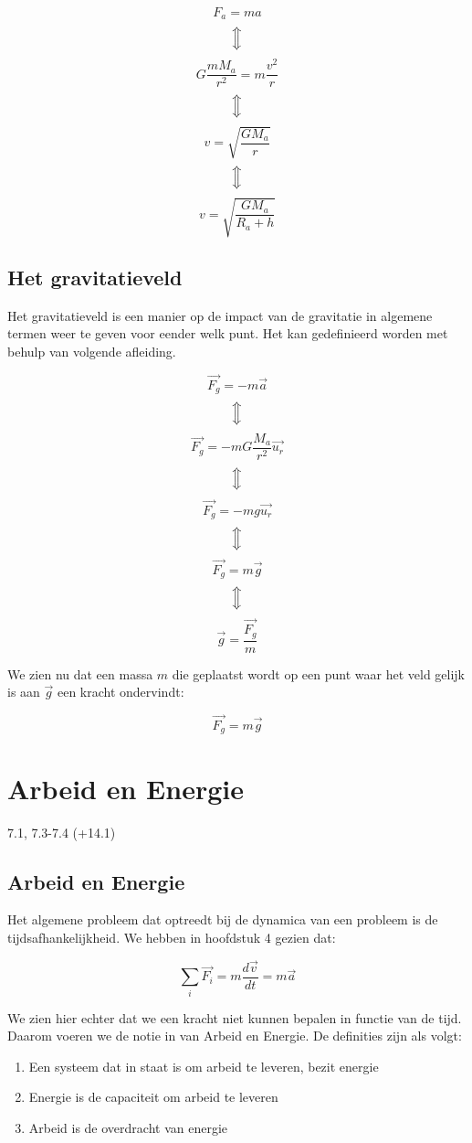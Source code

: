 \documentclass[12pt,a4paper]{article}
\newcommand{\Luda}{\Big\Updownarrow}
\begin{document}
    $$ F_{a} = ma $$
    $$\Luda$$
    $$ G\frac{mM_{a}}{r^{2}} = m\frac{v^{2}}{r} $$ 
    $$\Luda$$
    $$ v = \sqrt{\frac{GM_{a}}{r}}$$
    $$\Luda$$
    $$ v = \sqrt{\frac{GM_{a}}{R_{a} + h}} $$
    
    \subsection{Het gravitatieveld}
    Het gravitatieveld is een manier op de impact van de gravitatie in algemene termen weer te geven voor eender welk punt. Het kan gedefinieerd worden met behulp
    van volgende afleiding.
    
    $$ \vec{F_{g}} = -m\vec{a}$$
    $$\Luda$$
    $$ \vec{F_{g}} = -mG\frac{M_{a}}{r^{2}}\vec{u_{r}}$$
    $$\Luda$$
    $$ \vec{F_{g}} = -mg\vec{u_{r}}$$
    $$\Luda$$
    $$ \vec{F_{g}} = m\vec{g}$$
    $$\Luda$$
    $$ \vec{g} = \frac{\vec{F_{g}}}{m}$$
    
    We zien nu dat een massa $m$ die geplaatst wordt op een punt waar het veld gelijk is aan $\vec{g}$ een kracht ondervindt:
    
    $$ \vec{F_{g}} = m\vec{g}$$ 

    \section{Arbeid en Energie}
    7.1, 7.3-7.4 (+14.1)

    \subsection{Arbeid en Energie}
    Het algemene probleem dat optreedt bij de dynamica van een probleem is de tijdsafhankelijkheid.
    We hebben in hoofdstuk 4 gezien dat:
    
    $$ \sum_{i} \vec{F_{i}} = m\frac{d\vec{v}}{dt} = m\vec{a} $$
    
    We zien hier echter dat we een kracht niet kunnen bepalen in functie van de tijd. Daarom voeren
    we de notie in van Arbeid en Energie. De definities zijn als volgt:
    
    \begin{enumerate}
    	\item Een systeem dat in staat is om arbeid te leveren, bezit energie
    	\item Energie is de capaciteit om arbeid te leveren
    	\item Arbeid is de overdracht van energie
    \end{enumerate}
    
\end{document}
